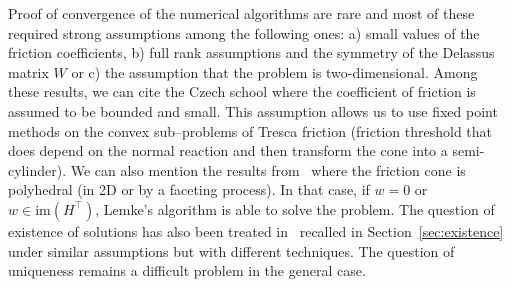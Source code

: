 {Proof of convergence} of the numerical algorithms are rare and most of these required strong assumptions among the following ones: a) small values of the friction coefficients, b) full rank assumptions and the symmetry of the Delassus matrix $W$ or c) the assumption that the problem is two-dimensional. Among these results, we can cite the Czech school where the coefficient of friction is assumed to be bounded and small. This assumption allows us to use fixed point methods on the convex sub--problems of Tresca friction {(friction threshold that does depend on the normal reaction and then transform the cone into a semi-cylinder)}.
%
We can also mention the results from~\cite{Pang.Trinkle1996,Stewart.Trinkle1996,Anitescu.Potra97} where the friction cone is polyhedral (in 2D or by a faceting process). In that case, if $w=0$ or $w \in \mathrm{im}(H^\top)$, Lemke's algorithm is able to solve the problem. The question of existence of solutions has also been treated in~\cite{Klarbring.Pang1998,Acary.ea_ZAMM2011} recalled in Section~\ref{sec:existence} under similar assumptions but with different techniques. The question of uniqueness remains a difficult problem in the general case.

